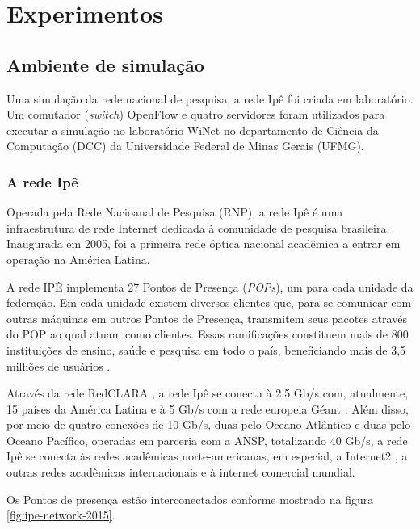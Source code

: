 \chapter{Experimentos}
\label{cap:experiments}

\section{Ambiente de simulação}

Uma simulação da rede nacional de pesquisa, a rede Ipê \citep{ipe2015network} 
foi criada em laboratório.
Um comutador (\emph{switch}) OpenFlow e quatro servidores foram utilizados 
para executar a simulação no laboratório WiNet \citep{winet22015lab}
no departamento de Ciência da Computação (DCC) da Universidade Federal 
de Minas Gerais (UFMG).

\subsection{A rede Ipê}
Operada pela Rede Nacioanal de Pesquisa (RNP), a rede Ipê é uma infraestrutura
de rede Internet dedicada à comunidade de pesquisa brasileira.
Inaugurada em 2005, foi a primeira rede óptica nacional acadêmica a entrar em
operação na América Latina.

A rede IPÊ implementa 27 Pontos de Presença (\emph{POPs}), um para cada unidade
da federação.
Em cada unidade existem diversos clientes que, para se comunicar com outras 
máquinas em outros Pontos de Presença, transmitem seus pacotes através do 
POP ao qual atuam como clientes.
Essas ramificações constituem mais de 800 instituições de ensino, saúde e 
pesquisa em todo o país, beneficiando mais de 3,5 milhões de usuários
\citep{ipe2015network}.

Através da rede RedCLARA \citep{redclara2015network}, a rede Ipê se conecta 
à 2,5 Gb/s com, atualmente, 15 países da América Latina e à 5 Gb/s com a rede
europeia Géant \citep{geant2015network}. 
Além disso, por meio de quatro conexões de
10 Gb/s, duas pelo Oceano Atlântico e duas pelo Oceano Pacífico, 
operadas em parceria com a ANSP, totalizando 40 Gb/s, a rede Ipê se conecta 
às redes acadêmicas norte-americanas, em especial, a  Internet2 
\citep{internet22015network}, a outras redes acadêmicas internacionais e à 
internet comercial mundial.

Os Pontos de presença estão interconectados conforme mostrado na figura 
\ref{fig:ipe-network-2015}.

